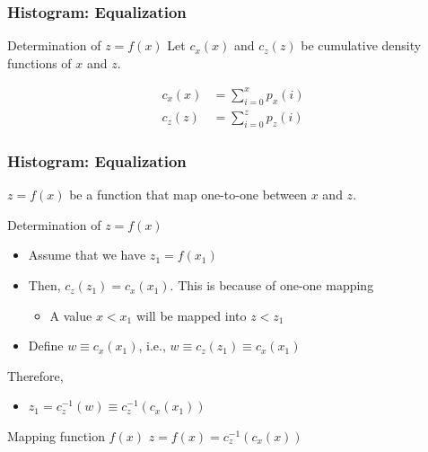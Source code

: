 \documentclass[english,11pt,table,handout]{beamer}
\begin{document}
\begin{frame}[fragile]
	\frametitle{Histogram: Equalization}
	
	\begin{block}{Determination of $z = f(x)$ }
		Let $c_x(x)$ and $c_z(z)$ be cumulative density functions of $x$ and $z$. 
		
		\begin{align}
		\nonumber
		c_x(x) &= \sum_{i=0}^{x}{p_x(i)}\\
		\nonumber
		c_z(z) &= \sum_{i=0}^{z}{p_z(i)}
		\end{align}
	\end{block}
\end{frame}


\begin{frame}[fragile]
	\frametitle{Histogram: Equalization}
	
	$z = f(x)$ be a function that map one-to-one between $x$ and $z$.
	\begin{block}{Determination of $z = f(x)$ }
		\begin{itemize}
			\item Assume that we have $z_1 = f(x_1)$ 
			\item Then, $c_z(z_1) = c_x(x_1)$. This is because of one-one mapping
			\begin{itemize}
				\item A value $x < x_1$ will be mapped into $z < z_1$
			\end{itemize}
			\item Define $w \equiv c_x(x_1)$, i.e., $w \equiv c_z(z_1) \equiv c_x(x_1)$
		\end{itemize}
		
		Therefore,
		\begin{itemize}
			\item $z_1 = c_z^{-1}(w) \equiv   c_z^{-1}(c_x(x_1))$
		\end{itemize}
	\end{block}
	\begin{alertblock}{Mapping function $f(x)$}
		\centering
		$z = f(x) =  c_z^{-1}(c_x(x))$
		
	\end{alertblock}
	
\end{frame}
\end{document}
